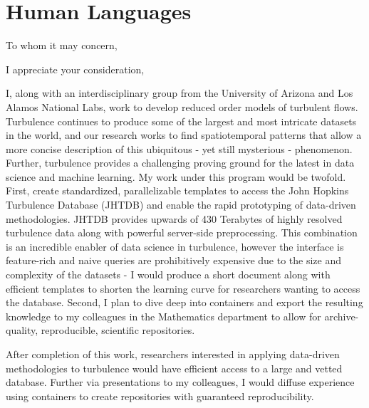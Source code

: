 \documentclass[11pt,a4paper,sans]{moderncv}        %
\begin{document}
\section{Human Languages}

\clearpage
\date{\today}
\opening{To whom it may concern,}
\closing{I appreciate your consideration,}
\makelettertitle

   I, along with an interdisciplinary group from the University of Arizona and Los Alamos National Labs, work to develop reduced order models of turbulent flows. Turbulence continues to produce some of the largest and most intricate datasets in the world, and our research works to find spatiotemporal patterns that allow a more concise description of this ubiquitous - yet still mysterious - phenomenon. Further, turbulence provides a challenging proving ground for the latest in data science and machine learning.
   My work under this program would be twofold. First, create standardized, parallelizable templates to access the John Hopkins Turbulence Database (JHTDB) and enable the rapid prototyping of data-driven methodologies. JHTDB provides upwards of 430 Terabytes of highly resolved turbulence data along with powerful server-side preprocessing. This combination is an incredible enabler of data science in turbulence, however the interface is feature-rich and naive queries are prohibitively expensive due to the size and complexity of the datasets - I would produce a short document along with efficient templates to shorten the learning curve for researchers wanting to access the database. Second, I plan to dive deep into containers and export the resulting knowledge to my colleagues in the Mathematics department to allow for archive-quality, reproducible, scientific repositories.

   After completion of this work, researchers interested in applying data-driven methodologies to turbulence would have efficient access to a large and vetted database. Further via presentations to my colleagues, I would diffuse experience using containers to create repositories with guaranteed reproducibility.
\end{document}
